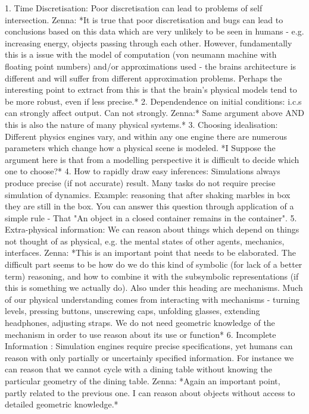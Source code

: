 \documentclass{tlp}
\begin{document}
1. Time Discretisation: Poor discretisation can lead to problems of self intersection. Zenna: *It is true that poor discretisation and bugs can lead to conclusions based on this data which are very unlikely to be seen in humans - e.g. increasing energy, objects passing through each other.  However, fundamentally this is a issue with the model of computation (von neumann machine with floating point numbers) and/or approximations used - the brains architecture is different and will suffer from different approximation problems.  Perhaps the interesting point to extract from this is that the brain's physical models tend to be more robust, even if less precise.* 
2. Dependendence on initial conditions: i.c.s can strongly affect output.  Can not strongly.  Zenna:* Same argument above AND this is also the nature of many physical systems.*
3. Choosing idealisation: Different physics engines vary, and within any one engine there are numerous parameters which change how a physical scene is modeled.  *I Suppose the argument here is that from a modelling perspective it is difficult to decide which one to choose?*
4. How to rapidly draw easy inferences: Simulations always produce precise (if not accurate) result.  Many tasks do not require precise simulation of dynamics.  Example: reasoning that after shaking marbles in box they are still in the box.  You can answer this question through application of a simple rule - That "An object in a closed container remains in the container".
5. Extra-physical information: We can reason about things which depend on things not thought of as physical, e.g. the mental states of other agents, mechanics, interfaces. Zenna: *This is an important point that needs to be elaborated.  The difficult part seems to be how do we do this kind of symbolic (for lack of a better term) reasoning, and how to combine it with the subsymbolic representations (if this is something we actually do). Also under this heading are mechanisms. Much of our physical understanding comes from interacting with mechanisms - turning levels, pressing buttons, unscrewing caps, unfolding glasses, extending headphones, adjusting straps.  We do not need geometric knowledge of the mechanism in order to use reason about its use or function*
6. Incomplete Information : Simulation engines require precise specifications, yet humans can reason with only partially or uncertainly specified information.  For instance we can reason that we cannot cycle with a dining table without knowing the particular geometry of the dining table. Zenna: *Again an important point, partly related to the previous one. I can reason about objects without access to detailed geometric knowledge.*
\end{document}

